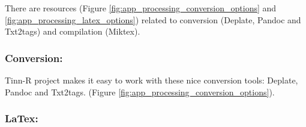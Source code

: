There are resources
(Figure \ref{fig:app_processing_conversion_options} and
\ref{fig:app_processing_latex_options})
related to conversion (Deplate, Pandoc and Txt2tags) and compilation (Miktex).


\hypertarget{working_app_processing_conversion}{}
\subsubsection{Conversion:}

Tinn-R project makes it easy to work with these nice conversion tools: Deplate, Pandoc and Txt2tags.
(Figure \ref{fig:app_processing_conversion_options}).


\hypertarget{working_app_processing_latex}{}
\subsubsection{LaTex:}

